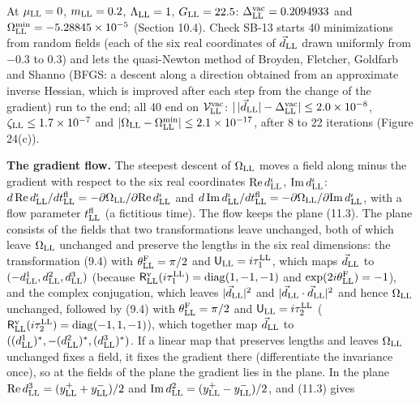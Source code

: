 \documentclass[
  10pt,
]{article}
\begin{document}
At \(\mu_{\rm LL}=0\), \(m_{\rm LL}=0.2\), \(\Lambda_{\rm LL}=1\),
\(G_{\rm LL}=22.5\): \(\Delta^{\rm vac}_{\rm LL}=0.2094933\) and
\(\Omega^{\rm min}_{\rm LL}=-5.28845\times10^{-5}\) (Section 10.4).
Check SB-13 starts 40 minimizations from random fields (each of the six
real coordinates of \(\vec d_{\rm LL}\) drawn uniformly from \(-0.3\) to
\(0.3\)) and lets the quasi-Newton method of Broyden, Fletcher, Goldfarb
and Shanno (BFGS: a descent along a direction obtained from an
approximate inverse Hessian, which is improved after each step from the
change of the gradient) run to the end; all 40 end on
\(\mathcal V^{\rm vac}_{\rm LL}\):
\(\lvert\,\lvert\vec d_{\rm LL}\rvert-\Delta^{\rm vac}_{\rm LL}\rvert\le2.0\times10^{-8}\),
\(\zeta_{\rm LL}\le1.7\times10^{-7}\) and
\(\lvert\Omega_{\rm LL}-\Omega^{\rm min}_{\rm LL}\rvert\le2.1\times10^{-17}\),
after 8 to 22 iterations (Figure 24(c)).

\textbf{The gradient flow.} The steepest descent of \(\Omega_{\rm LL}\)
moves a field along minus the gradient with respect to the six real
coordinates \({\rm Re}\,d^\iota_{\rm LL}\),
\({\rm Im}\,d^\iota_{\rm LL}\):
\(d\,{\rm Re}\,d^\iota_{\rm LL}/dt^{\rm fl}_{\rm LL}=-\partial\Omega_{\rm LL}/\partial{\rm Re}\,d^\iota_{\rm LL}\)
and
\(d\,{\rm Im}\,d^\iota_{\rm LL}/dt^{\rm fl}_{\rm LL}=-\partial\Omega_{\rm LL}/\partial{\rm Im}\,d^\iota_{\rm LL}\),
with a flow parameter \(t^{\rm fl}_{\rm LL}\) (a fictitious time). The
flow keeps the plane (11.3). The plane consists of the fields that two
transformations leave unchanged, both of which leave \(\Omega_{\rm LL}\)
unchanged and preserve the lengths in the six real dimensions: the
transformation (9.4) with \(\theta^{\rm F}_{\rm LL}=\pi/2\) and
\(\mathsf U_{\rm LL}=i\tau^{\rm LL}_1\), which maps \(\vec d_{\rm LL}\)
to \((-d^1_{\rm LL},d^2_{\rm LL},d^3_{\rm LL})\) (because
\(\mathsf R^{\rm v}_{\rm LL}(i\tau^{\rm LL}_1)=\mathrm{diag}(1,-1,-1)\)
and \(\exp(2i\theta^{\rm F}_{\rm LL})=-1\)), and the complex
conjugation, which leaves \(\lvert\vec d_{\rm LL}\rvert^2\) and
\(\lvert\vec d_{\rm LL}\cdot\vec d_{\rm LL}\rvert^2\) and hence
\(\Omega_{\rm LL}\) unchanged, followed by (9.4) with
\(\theta^{\rm F}_{\rm LL}=\pi/2\) and
\(\mathsf U_{\rm LL}=i\tau^{\rm LL}_2\)
(\(\mathsf R^{\rm v}_{\rm LL}(i\tau^{\rm LL}_2)=\mathrm{diag}(-1,1,-1)\)),
which together map \(\vec d_{\rm LL}\) to
\(((d^1_{\rm LL})^*,-(d^2_{\rm LL})^*,(d^3_{\rm LL})^*)\). If a linear
map that preserves lengths and leaves \(\Omega_{\rm LL}\) unchanged
fixes a field, it fixes the gradient there (differentiate the invariance
once), so at the fields of the plane the gradient lies in the plane. In
the plane \({\rm Re}\,d^3_{\rm LL}=(y^+_{\rm LL}+y^-_{\rm LL})/2\) and
\({\rm Im}\,d^2_{\rm LL}=(y^+_{\rm LL}-y^-_{\rm LL})/2\), and (11.3)
gives
\end{document}
